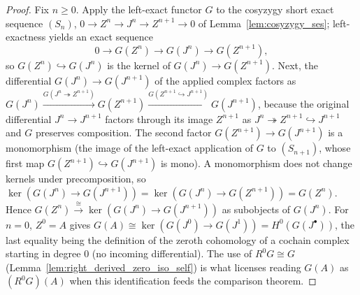 \begin{proof}
  Fix \(n \geq 0\). Apply the left-exact functor \(G\) to the cosyzygy short exact
  sequence \((S_n)\), \(0 \to Z^n \to J^n \to Z^{n+1} \to 0\) of
  Lemma~\ref{lem:cosyzygy_ses}; left-exactness yields an exact sequence
  \[
    0 \longrightarrow G(Z^n) \longrightarrow G(J^n) \longrightarrow G(Z^{n+1}),
  \]
  so \(G(Z^n) \hookrightarrow G(J^n)\) is the kernel of \(G(J^n) \to G(Z^{n+1})\).
  Next, the differential \(G(J^n) \to G(J^{n+1})\) of the applied complex factors as
  \(G(J^n) \xrightarrow{G(J^n \twoheadrightarrow Z^{n+1})} G(Z^{n+1})
  \xrightarrow{G(Z^{n+1} \hookrightarrow J^{n+1})} G(J^{n+1})\), because the original
  differential \(J^n \to J^{n+1}\) factors through its image \(Z^{n+1}\) as
  \(J^n \twoheadrightarrow Z^{n+1} \hookrightarrow J^{n+1}\) and \(G\) preserves
  composition. The second factor \(G(Z^{n+1}) \to G(J^{n+1})\) is a monomorphism (the
  image of the left-exact application of \(G\) to \((S_{n+1})\), whose first map
  \(G(Z^{n+1}) \hookrightarrow G(J^{n+1})\) is mono). A monomorphism does not change
  kernels under precomposition, so
  \(\ker(G(J^n) \to G(J^{n+1})) = \ker(G(J^n) \to G(Z^{n+1})) = G(Z^n)\). Hence
  \(G(Z^n) \xrightarrow{\cong} \ker(G(J^n) \to G(J^{n+1}))\) as subobjects of
  \(G(J^n)\). For \(n = 0\), \(Z^0 = A\) gives
  \(G(A) \cong \ker(G(J^0) \to G(J^1)) = H^0(G(J^\bullet))\), the last equality being
  the definition of the zeroth cohomology of a cochain complex starting in degree
  \(0\) (no incoming differential). The use of \(R^0 G \cong G\)
  (Lemma~\ref{lem:right_derived_zero_iso_self}) is what licenses reading \(G(A)\) as
  \((R^0 G)(A)\) when this identification feeds the comparison theorem.
\end{proof}


